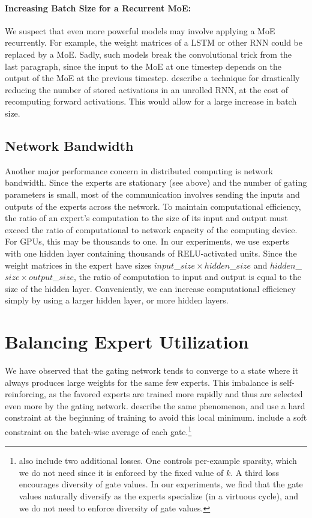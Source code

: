 \documentclass{article} %
\begin{document}
\paragraph{Increasing Batch Size for a Recurrent MoE:}  We suspect that even more powerful models may involve applying a MoE recurrently.  For example, the weight matrices of a LSTM or other RNN could be replaced by a MoE.   Sadly, such models break the convolutional trick from the last paragraph, since the input to the MoE at one timestep depends on the output of the MoE at the previous timestep.  \cite{Gruslys16} describe a technique for drastically reducing the number of stored activations in an unrolled RNN, at the cost of recomputing forward activations.   This would allow for a large increase in batch size.

\subsection{Network Bandwidth}
Another major performance concern in distributed computing is network bandwidth.  Since the experts are stationary (see above) and the number of gating parameters is small, most of the communication involves sending the inputs and outputs of the experts across the network.  To maintain computational efficiency, the ratio of an expert's computation to the size of its input and output must exceed the ratio of computational to network capacity of the computing device.   For GPUs, this may be thousands to one.  In our experiments, we use experts with one hidden layer containing thousands of RELU-activated units.  Since the weight matrices in the expert have sizes $input$\_${size} \times hidden$\_${size}$ and $hidden$\_${size} \times output$\_${size}$, the ratio of computation to input and output is equal to the size of the hidden layer.  Conveniently, we can increase computational efficiency simply by using a larger hidden layer, or more hidden layers.


\section{Balancing Expert Utilization}  
\label{sec:losses}

We have observed that the gating network tends to converge to a state where it always produces large weights for the same few experts.  This imbalance is self-reinforcing, as the favored experts are trained more rapidly and thus are selected even more by the gating network.   \cite{eigen2013learning} describe the same phenomenon, and use a hard constraint at the beginning of training to avoid this local minimum.  \cite{Bengio15:CondComp} include a soft constraint on the batch-wise average of each gate.\footnote{\cite{Bengio15:CondComp} also include two additional losses.  One controls per-example sparsity, which we do not need since it is enforced by the fixed value of $k$.  A third loss encourages diversity of gate values.  In our experiments, we find that the gate values naturally diversify as the experts specialize (in a virtuous cycle), and we do not need to enforce diversity of gate values.}
\end{document}
